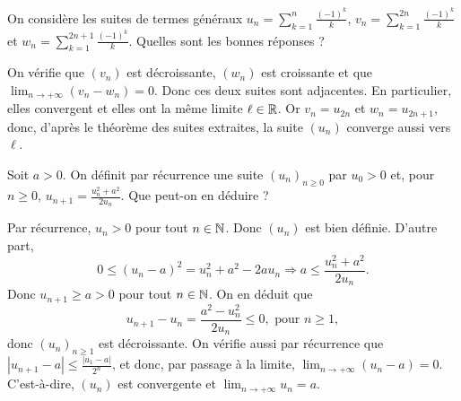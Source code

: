 \begin{question}
On considère les suites de termes généraux $\displaystyle u_n=\sum _{k=1}^n\frac{(-1)^k}{k}$, $\displaystyle v_n=\sum _{k=1}^{2n}\frac{(-1)^k}{k}$ et $\displaystyle w_n=\sum _{k=1}^{2n+1}\frac{(-1)^k}{k}$. Quelles sont les bonnes réponses ?
\begin{answers}  
\end{answers}
\begin{explanations}
On vérifie que $(v_n)$ est décroissante, $(w_n)$ est croissante et que $\displaystyle \lim _{n\to +\infty}(v_n-w_n)=0$. Donc ces deux suites sont adjacentes. En particulier, elles convergent et elles ont la même limite $\ell \in \mathbb{R}$. Or $v_n=u_{2n}$ et $w_n=u_{2n+1}$, donc, d'après le théorème des suites extraites, la suite $(u_n)$ converge aussi vers $\displaystyle \ell$.
\end{explanations}
\end{question}


\begin{question}
Soit $a>0$. On définit par récurrence une suite $(u_n)_{n\geq 0}$ par $u_0>0$ et, pour $n\geq 0$, $\displaystyle u_{n+1}= \frac{u_n^2+a^2}{2u_n}$. Que peut-on en déduire ?
\begin{answers}  
\end{answers}
\begin{explanations}
Par récurrence, $u_n>0$ pour tout $n\in \mathbb{N}$. Donc $(u_n)$ est bien définie. D'autre part, 
$$\displaystyle 0\leq (u_n-a)^2=u_n^2+a^2-2au_n \Rightarrow  a\leq \frac{u_n^2+a^2}{2u_n}.$$
Donc $u_{n+1}\geq a>0$ pour tout $n\in \mathbb{N}$. On en déduit que
$$\displaystyle u_{n+1}-u_n=\frac{a^2-u_n^2}{2u_n}\leq 0,\mbox{ pour }n\geq 1,$$
donc $(u_n)_{n\geq 1}$ est décroissante. On vérifie aussi par récurrence que $\displaystyle \left|u_{n+1}-a\right|\leq \frac{\left|u_1-a\right|}{2^n}$, et donc, par passage à la limite, $\displaystyle \lim _{n\to +\infty}(u_n-a)=0$. C'est-à-dire, $(u_n)$ est convergente et $\displaystyle \lim _{n\to +\infty}u_n=a$.
\end{explanations}
\end{question}


